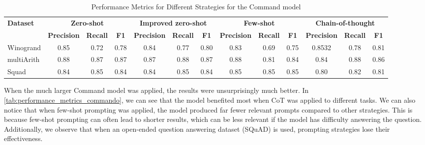 \documentclass[fleqn,moreauthors,10pt]{ds_report}
\begin{document}
\begin{table}[!htbp]
\centering
\begin{adjustbox}{width=\columnwidth}
\begin{tabular}{@{}lcccccccccccc@{}}
\toprule
\textbf{Dataset} & \multicolumn{3}{c}{\textbf{Zero-shot}} & \multicolumn{3}{c}{\textbf{Improved zero-shot}} & \multicolumn{3}{c}{\textbf{Few-shot}} & \multicolumn{3}{c}{\textbf{Chain-of-thought}} \\
 & \textbf{Precision} & \textbf{Recall} & \textbf{F1} & \textbf{Precision} & \textbf{Recall} & \textbf{F1} & \textbf{Precision} & \textbf{Recall} & \textbf{F1} & \textbf{Precision} & \textbf{Recall} & \textbf{F1} \\ \midrule
Winogrand & 0.85 & 0.72 & 0.78 & 0.84 & 0.77 & 0.80 & 0.83 & 0.69 & 0.75 & 0.8532 & 0.78 & 0.81 \\
multiArith & 0.88 &  0.87 & 0.87 & 0.87 & 0.88 & 0.87 & 0.88 & 0.81 & 0.84 & 0.84 & 0.88 & 0.86 \\ 
Squad & 0.84 &  0.85 & 0.84 & 0.84 & 0.85 & 0.84 & 0.85 & 0.85 & 0.85 & 0.80 & 0.82 & 0.81 \\
\bottomrule
\end{tabular}
\end{adjustbox}
\caption{Performance Metrics for Different Strategies for the Command model}
\label{tab:performance_metrics_coomando}
\end{table}

When the much larger Command model was applied, the results were unsurprisingly much better. In \ref{tab:performance_metrics_commando}, we can see that the model benefited most when CoT was applied to different tasks. We can also notice that when few-shot prompting was applied, the model produced far fewer relevant prompts compared to other strategies. This is because few-shot prompting can often lead to shorter results, which can be less relevant if the model has difficulty answering the question. Additionally, we observe that when an open-ended question answering dataset (SQuAD) is used, prompting strategies lose their effectiveness.
\end{document}
